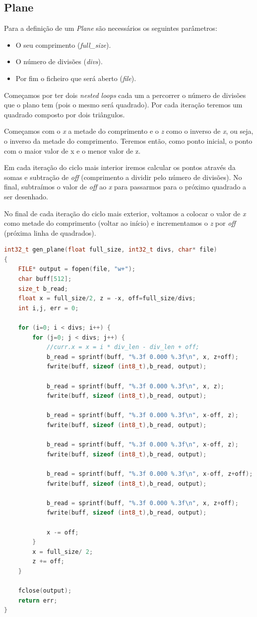 \documentclass[14pt, a4 paper]{article}
\begin{document}
\subsection{Plane}
Para a definição de um \textit{Plane} são necessários os seguintes parâmetros:
\begin{itemize}
\item O seu comprimento (\textit{full\_size}).

\item O número de divisões (\textit{divs}).

\item Por fim o ficheiro que será aberto (\textit{file}).
\end{itemize}

Começamos por ter dois \textit{nested loops} cada um a percorrer o número de divisões que o plano tem (pois o mesmo será quadrado). Por cada iteração teremos um quadrado composto por dois triângulos.

Começamos com o \textit{x} a metade do comprimento e o \textit{z} como o inverso de \textit{x}, ou seja, o inverso da metade do comprimento. Teremos então, como ponto inicial, o ponto com o maior valor de x e o menor valor de z.

Em cada iteração do ciclo mais interior iremos calcular os pontos através da somas e subtração de \textit{off} (comprimento a dividir pelo número de divisões). No final, subtraímos o valor de \textit{off} ao \textit{x} para passarmos para o próximo quadrado a ser desenhado.

No final de cada iteração do ciclo mais exterior, voltamos a colocar o valor de \textit{x} como metade do comprimento (voltar ao início) e incrementamos o \textit{z} por \textit{off} (próxima linha de quadrados).

\begin{lstlisting}[language=c++]
int32_t gen_plane(float full_size, int32_t divs, char* file)
{
	FILE* output = fopen(file, "w+"); 
	char buff[512];
	size_t b_read;
	float x = full_size/2, z = -x, off=full_size/divs;
	int i,j, err = 0;

	for (i=0; i < divs; i++) {
		for (j=0; j < divs; j++) {
			//curr.x = x = i * div_len - div_len + off;
			b_read = sprintf(buff, "%.3f 0.000 %.3f\n", x, z+off);
			fwrite(buff, sizeof (int8_t),b_read, output);

			b_read = sprintf(buff, "%.3f 0.000 %.3f\n", x, z);
			fwrite(buff, sizeof (int8_t),b_read, output);
			
			b_read = sprintf(buff, "%.3f 0.000 %.3f\n", x-off, z);
			fwrite(buff, sizeof (int8_t),b_read, output);

			b_read = sprintf(buff, "%.3f 0.000 %.3f\n", x-off, z);
			fwrite(buff, sizeof (int8_t),b_read, output);
			
			b_read = sprintf(buff, "%.3f 0.000 %.3f\n", x-off, z+off);
			fwrite(buff, sizeof (int8_t),b_read, output);

			b_read = sprintf(buff, "%.3f 0.000 %.3f\n", x, z+off);
			fwrite(buff, sizeof (int8_t),b_read, output);

			x -= off;
		}
		x = full_size/ 2;
		z += off;
	}

	fclose(output);
	return err;
}
\end{lstlisting}
\end{document}
